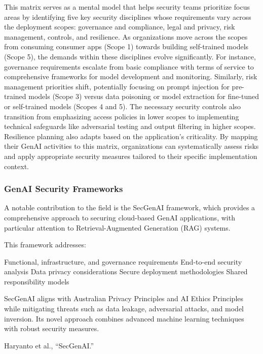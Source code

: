 This matrix serves as a mental model\cite{noauthor_securing_nodate} that helps security teams prioritize focus areas by identifying five key security disciplines whose requirements vary across the deployment scopes: governance and compliance, legal and privacy, risk management, controls, and resilience\cite{noauthor_securing_2023}\cite{noauthor_securing_nodate}. As organizations move across the scopes from consuming consumer apps (Scope 1) towards building self-trained models (Scope 5), the demands within these disciplines evolve significantly. For instance, governance requirements escalate from basic compliance with terms of service to comprehensive frameworks for model development and monitoring. Similarly, risk management priorities shift, potentially focusing on prompt injection for pre-trained models (Scope 3) versus data poisoning or model extraction for fine-tuned or self-trained models (Scopes 4 and 5). The necessary security controls also transition from emphasizing access policies in lower scopes to implementing technical safeguards like adversarial testing and output filtering in higher scopes. Resilience planning also adapts based on the application's criticality. By mapping their GenAI activities to this matrix, organizations can systematically assess risks and apply appropriate security measures tailored to their specific implementation context.

\subsubsection{GenAI Security Frameworks} %
\label{sec:GenAI Security Frameworks}

A notable contribution to the field is the SecGenAI framework, which provides a comprehensive approach to securing cloud-based GenAI applications, with particular attention to Retrieval-Augmented Generation (RAG) systems.

This framework addresses:

Functional, infrastructure, and governance requirements
End-to-end security analysis
Data privacy considerations
Secure deployment methodologies
Shared responsibility models

SecGenAI aligns with Australian Privacy Principles and AI Ethics Principles while mitigating threats such as data leakage, adversarial attacks, and model inversion. Its novel approach combines advanced machine learning techniques with robust security measures.

Haryanto et al., “SecGenAI.”

